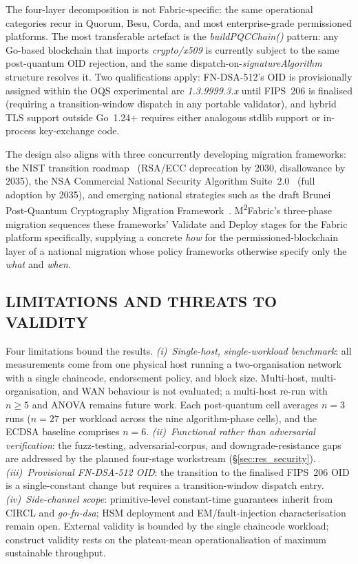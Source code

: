 \documentclass{ieeetj}
\newcommand{\mfabric}{M\textsuperscript{2}Fabric}
\begin{document}
The four-layer decomposition is not Fabric-specific: the same
operational categories recur in Quorum, Besu, Corda, and most
enterprise-grade permissioned platforms. The most transferable artefact
is the \textit{buildPQCChain()} pattern: any Go-based blockchain that
imports \textit{crypto/x509} is currently subject to the same
post-quantum OID rejection, and the same
dispatch-on-\textit{signatureAlgorithm} structure resolves it. Two
qualifications apply: FN-DSA-512's OID is provisionally assigned within
the OQS experimental arc \textit{1.3.9999.3.x} until FIPS~206 is
finalised (requiring a transition-window dispatch in any portable
validator), and hybrid TLS support outside Go~1.24+ requires either
analogous stdlib support or in-process key-exchange code.

The design also aligns with three concurrently developing migration
frameworks: the NIST transition roadmap~\cite{nist_ir8547} (RSA/ECC
deprecation by 2030, disallowance by 2035), the NSA Commercial National
Security Algorithm Suite~2.0~\cite{nsa_cnsa2} (full adoption by 2035),
and emerging national strategies such as the draft Brunei Post-Quantum
Cryptography Migration Framework~\cite{csb_brunei2026}.
\mfabric{}'s three-phase migration sequences these frameworks' Validate
and Deploy stages for the Fabric platform specifically, supplying a
concrete \emph{how} for the permissioned-blockchain layer of a national
migration whose policy frameworks otherwise specify only the \emph{what}
and \emph{when}.

\subsection{LIMITATIONS AND THREATS TO VALIDITY}
\label{sec:disc_limits}

Four limitations bound the results.
\emph{(i)~Single-host, single-workload benchmark}: all measurements come
from one physical host running a two-organisation network with a single
chaincode, endorsement policy, and block size. Multi-host,
multi-organisation, and WAN behaviour is not evaluated; a multi-host
re-run with $n\geq 5$ and ANOVA remains future work. Each post-quantum
cell averages $n=3$ runs ($n=27$ per workload across the nine
algorithm-phase cells), and the ECDSA baseline comprises $n=6$.
\emph{(ii)~Functional rather than adversarial verification}: the
fuzz-testing, adversarial-corpus, and downgrade-resistance gaps are
addressed by the planned four-stage workstream
(\S\ref{sec:res_security}). \emph{(iii)~Provisional FN-DSA-512 OID}:
the transition to the finalised FIPS~206 OID is a single-constant
change but requires a transition-window dispatch entry.
\emph{(iv)~Side-channel scope}: primitive-level constant-time guarantees
inherit from CIRCL and \textit{go-fn-dsa}; HSM deployment and
EM/fault-injection characterisation~\cite{ravi2024sidechannel} remain
open. External validity is bounded by the single chaincode workload;
construct validity rests on the plateau-mean operationalisation of
maximum sustainable throughput.
\end{document}
